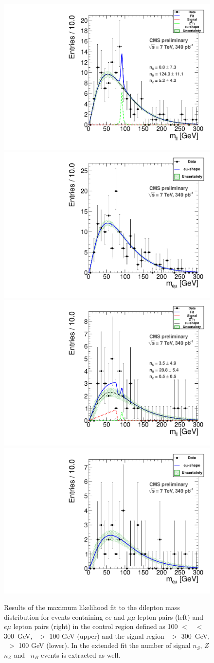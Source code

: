 \begin{figure}[hbt]
\begin{center}
\includegraphics[width=0.48\linewidth]{plots_final/fit2011_Control_Data.pdf}
\includegraphics[width=0.48\linewidth]{plots_final/fit2011OFOS_Control_Data.pdf}
\includegraphics[width=0.48\linewidth]{plots_final/fit2011_Signal_Data.pdf}
\includegraphics[width=0.48\linewidth]{plots_final/fit2011OFOS_Signal_Data.pdf}
\caption{\label{fig:dilmass}\protect 
Results of the maximum likelihood fit to the dilepton mass distribution for events containing 
$ee$ and $\mu\mu$ lepton pairs (left) and $e\mu$ lepton pairs (right) in the control
region defined as 100 $<$ \Ht\ $<$ 300~GeV, \MET\ $>$ 100 GeV (upper) and the signal region
\Ht\ $>$ 300~GeV, \MET\ $>$ 100 GeV (lower). In the extended fit the number of
signal $n_{S}$, $Z$ $n_Z$ and \ttbar\ $n_B$ events is extracted as well.
}
\end{center}
\end{figure}

